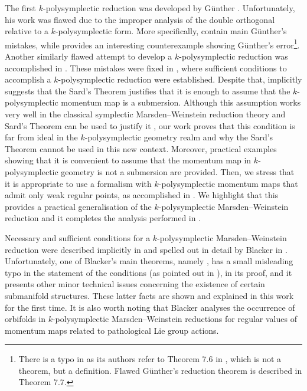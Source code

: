 \documentclass[11pt]{article}
\theoremstyle{plain}
\theoremstyle{definition}
\numberwithin{equation}{section}
\begin{document}
The first $k$-polysymplectic reduction was developed by G\"unther \cite{Awa_92,LSV_15,Gun_87}. Unfortunately, his work was flawed due to the improper analysis of the double orthogonal relative to a $k$-polysymplectic form. More specifically, \cite[Lemma 7.5 and Theorem 7.7]{Gun_87} contain main G\"unther's mistakes, while \cite[Section 2.2]{MRSV_15} provides an interesting counterexample showing G\"unther's error\footnote{There is a typo in \cite[pg. 4]{MRSV_15} as its authors refer to Theorem 7.6 in \cite{Gun_87}, which is not a theorem, but a definition. Flawed G\"unther's reduction theorem is described in Theorem 7.7.}. Another similarly flawed attempt to develop a $k$-polysymplectic reduction was accomplished in \cite{MRS_04}. These mistakes were fixed in \cite{MRSV_15}, where sufficient conditions to accomplish a $k$-polysymplectic reduction were established. Despite that, \cite[Lemma 3.4]{MRSV_15} implicitly suggests that the Sard's Theorem justifies that it is enough to assume that the $k$-polysymplectic momentum map is a submersion. Although this assumption works very well in the classical symplectic Marsden--Weinstein reduction theory and Sard's Theorem can be used to justify it \cite{BR_04},  
our work proves that this condition is far from ideal in the $k$-polysymplectic geometry realm and why the Sard's Theorem cannot be used in this new context. Moreover, practical examples showing that it is convenient to assume that the momentum map in $k$-polysymplectic geometry is not a submersion are provided. Then, we stress that it is appropriate to use a formalism with $k$-polysymplectic momentum maps that admit only weak regular points, as accomplished in \cite{LRVZ_23}. We highlight that this provides a practical generalisation of the $k$-polysymplectic Marsden--Weinstein reduction and it completes the analysis performed in \cite{Bla_19,GM_23,Gun_87,MRSV_15}.

Necessary and sufficient conditions for a $k$-polysymplectic Marsden--Weinstein reduction were described implicitly in \cite[pg. 12]{MRSV_15} and spelled out in detail by Blacker in \cite{Bla_19}. Unfortunately, one of Blacker's main theorems, namely \cite[Theorem 3.22]{Bla_19}, has a small misleading typo in the statement of the conditions (as pointed out in \cite{GM_23}), in its proof, and it presents other minor technical issues concerning the existence of certain submanifold structures. These latter facts are shown and explained in this work for the first time. It is also worth noting that Blacker analyses the occurrence of orbifolds in $k$-polysymplectic Marsden--Weinstein reductions for regular values of momentum maps related to pathological Lie group actions.  
\end{document}
